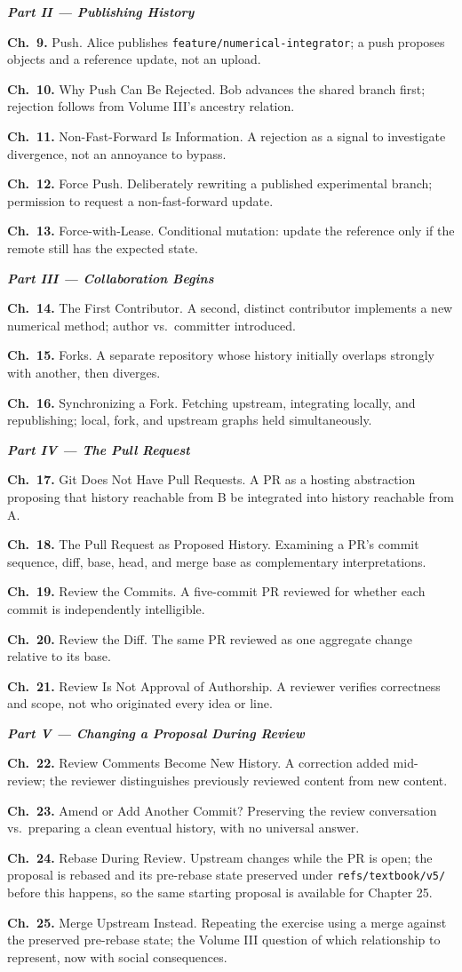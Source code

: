\documentclass[11pt]{book}
\newcommand{\chapentry}[2]{\noindent\textbf{Ch.~#1.} #2\par\smallskip}
\newcommand{\partheading}[1]{\bigskip\noindent\textbf{\textit{#1}}\smallskip\par}
\begin{document}
\partheading{Part II --- Publishing History}
\chapentry{9}{Push. Alice publishes \texttt{feature/numerical-integrator}; a push proposes objects and a reference update, not an upload.}
\chapentry{10}{Why Push Can Be Rejected. Bob advances the shared branch first; rejection follows from Volume III's ancestry relation.}
\chapentry{11}{Non-Fast-Forward Is Information. A rejection as a signal to investigate divergence, not an annoyance to bypass.}
\chapentry{12}{Force Push. Deliberately rewriting a published experimental branch; permission to request a non-fast-forward update.}
\chapentry{13}{Force-with-Lease. Conditional mutation: update the reference only if the remote still has the expected state.}

\partheading{Part III --- Collaboration Begins}
\chapentry{14}{The First Contributor. A second, distinct contributor implements a new numerical method; author vs.\ committer introduced.}
\chapentry{15}{Forks. A separate repository whose history initially overlaps strongly with another, then diverges.}
\chapentry{16}{Synchronizing a Fork. Fetching upstream, integrating locally, and republishing; local, fork, and upstream graphs held simultaneously.}

\partheading{Part IV --- The Pull Request}
\chapentry{17}{Git Does Not Have Pull Requests. A PR as a hosting abstraction proposing that history reachable from B be integrated into history reachable from A.}
\chapentry{18}{The Pull Request as Proposed History. Examining a PR's commit sequence, diff, base, head, and merge base as complementary interpretations.}
\chapentry{19}{Review the Commits. A five-commit PR reviewed for whether each commit is independently intelligible.}
\chapentry{20}{Review the Diff. The same PR reviewed as one aggregate change relative to its base.}
\chapentry{21}{Review Is Not Approval of Authorship. A reviewer verifies correctness and scope, not who originated every idea or line.}

\partheading{Part V --- Changing a Proposal During Review}
\chapentry{22}{Review Comments Become New History. A correction added mid-review; the reviewer distinguishes previously reviewed content from new content.}
\chapentry{23}{Amend or Add Another Commit? Preserving the review conversation vs.\ preparing a clean eventual history, with no universal answer.}
\chapentry{24}{Rebase During Review. Upstream changes while the PR is open; the proposal is rebased and its pre-rebase state preserved under \texttt{refs/textbook/v5/} before this happens, so the same starting proposal is available for Chapter 25.}
\chapentry{25}{Merge Upstream Instead. Repeating the exercise using a merge against the preserved pre-rebase state; the Volume III question of which relationship to represent, now with social consequences.}
\end{document}

